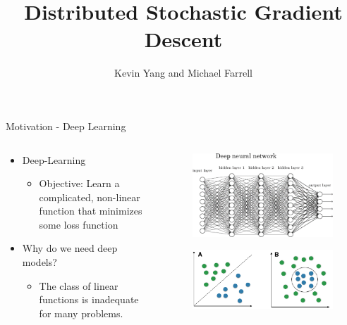 \documentclass{beamer}
\title{ Distributed Stochastic Gradient Descent }
\author{Kevin Yang and Michael Farrell}
\begin{document}
\begin{frame}
  \titlepage
\end{frame}

\begin{frame}{Motivation - Deep Learning}

\begin{columns}[T] %
\begin{column}{.48\textwidth}
\begin{itemize}
\item Deep-Learning
\begin{itemize}
\item Objective: Learn a complicated, non-linear function that minimizes some loss function
\end{itemize}
\item Why do we need deep models?
\begin{itemize}
\item The class of linear functions is inadequate for many problems.
\end{itemize}
\end{itemize}
\end{column}%
\hfill%
\begin{column}{.48\textwidth}
\begin{figure}
    \includegraphics[scale = .35]{./img/deep_learning}
      \caption{}
\end{figure}
\begin{figure}
    \includegraphics[scale = .17]{./img/lin_v_nonlin}
      \caption{}
\end{figure}
\end{column}%
\end{columns}
\end{frame}
\end{document}
